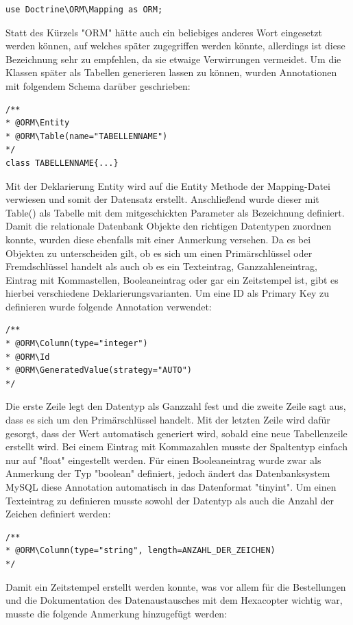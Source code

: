 	\lstset{language=php}
  	\begin{lstlisting}
use Doctrine\ORM\Mapping as ORM;
  	\end{lstlisting}
Statt des Kürzels "ORM" hätte auch ein beliebiges anderes Wort eingesetzt werden können, auf welches später zugegriffen werden könnte, allerdings ist diese Bezeichnung sehr zu empfehlen, da sie etwaige Verwirrungen vermeidet.
Um die Klassen später als Tabellen generieren lassen zu können, wurden Annotationen mit folgendem Schema darüber geschrieben:

	\lstset{language=php}
  	\begin{lstlisting}
/**
* @ORM\Entity
* @ORM\Table(name="TABELLENNAME")
*/
class TABELLENNAME{...}
  	\end{lstlisting}
Mit der Deklarierung Entity wird auf die Entity Methode der Mapping-Datei verwiesen und somit der Datensatz erstellt. Anschließend wurde dieser mit Table() als Tabelle mit dem mitgeschickten Parameter als Bezeichnung definiert.
Damit die relationale Datenbank Objekte den richtigen Datentypen zuordnen konnte, wurden diese ebenfalls mit einer Anmerkung versehen. Da es bei Objekten zu unterscheiden gilt, ob es sich um einen Primärschlüssel oder Fremdschlüssel handelt als auch ob es ein Texteintrag, Ganzzahleneintrag, Eintrag mit Kommastellen, Booleaneintrag oder gar ein Zeitstempel ist, gibt es hierbei verschiedene Deklarierungsvarianten.
Um eine ID als Primary Key zu definieren wurde folgende Annotation verwendet:
	\lstset{language=php}
  	\begin{lstlisting}
/**
* @ORM\Column(type="integer")
* @ORM\Id
* @ORM\GeneratedValue(strategy="AUTO")
*/
  	\end{lstlisting}
Die erste Zeile legt den Datentyp als Ganzzahl fest und die zweite Zeile sagt aus, dass es sich um den Primärschlüssel handelt. Mit der letzten Zeile wird dafür gesorgt, dass der Wert automatisch generiert wird, sobald eine neue Tabellenzeile erstellt wird.
Bei einem Eintrag mit Kommazahlen musste der Spaltentyp einfach nur auf "float" eingestellt werden. Für einen Booleaneintrag wurde zwar als Anmerkung der Typ "boolean" definiert, jedoch ändert das Datenbanksystem MySQL diese Annotation automatisch in das Datenformat "tinyint".
Um einen Texteintrag zu definieren musste sowohl der Datentyp als auch die Anzahl der Zeichen definiert werden:

	\lstset{language=php}
  	\begin{lstlisting}
/**
* @ORM\Column(type="string", length=ANZAHL_DER_ZEICHEN)
*/
  	\end{lstlisting}
Damit ein Zeitstempel erstellt werden konnte, was vor allem für die Bestellungen und die Dokumentation des Datenaustausches mit dem Hexacopter wichtig war, musste die folgende Anmerkung hinzugefügt werden:

